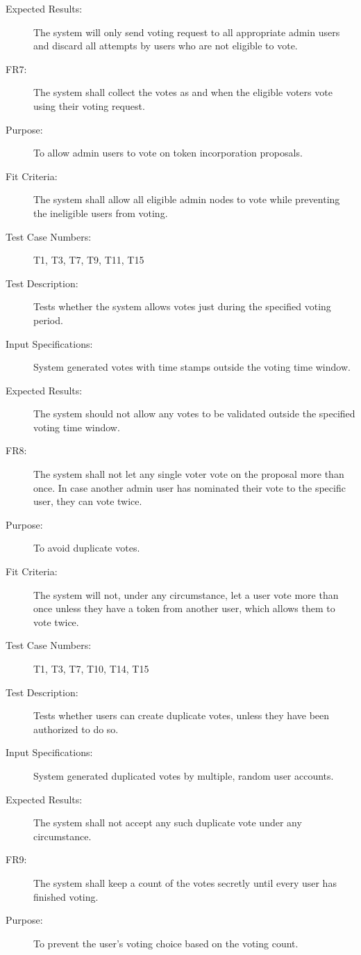 \documentclass[a4paper,twoside,phd]{BYUPhys}
\begin{document}
\begin{description}
\item[Expected Results:] The system will only send voting request to all appropriate admin users and discard all attempts by users who are not eligible to vote.
\\
\item[FR7:] The system shall collect the votes as and when the eligible voters vote using their voting request.
\item[Purpose:] To allow admin users to vote on token incorporation proposals.
\item[Fit Criteria:] The system shall allow all eligible admin nodes to vote while preventing the ineligible users from voting.
\item[Test Case Numbers:] T1, T3, T7, T9, T11, T15
\item[Test Description:] Tests whether the system allows votes just during the specified voting period.
\item[Input Specifications:] System generated votes with time stamps outside the voting time window.
\item[Expected Results:] The system should not allow any votes to be validated outside the specified voting time window.
\\
\item[FR8:] The system shall not let any single voter vote on the proposal more than once. In case another admin user has nominated their vote to the specific user, they can vote twice.
\item[Purpose:] To avoid duplicate votes.
\item[Fit Criteria:] The system will not, under any circumstance, let a user vote more than once unless they have a token from another user, which allows them to vote twice.
\item[Test Case Numbers:] T1, T3, T7, T10, T14, T15
\item[Test Description:] Tests whether users can create duplicate votes, unless they have been authorized to do so.
\item[Input Specifications:] System generated duplicated votes by multiple, random user accounts.
\item[Expected Results:] The system shall not accept any such duplicate vote under any circumstance.
\\
\item[FR9:] The system shall keep a count of the votes secretly until every user has finished voting.
\item[Purpose:] To prevent the user's voting choice based on the voting count.

\end{description}
\end{document}
